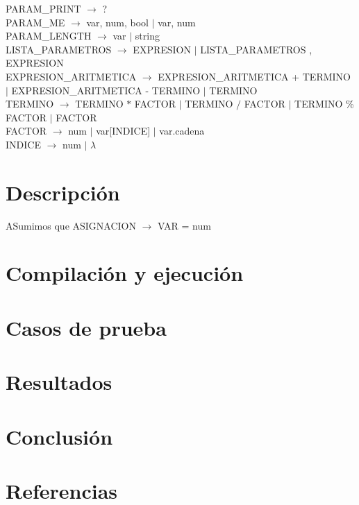 \documentclass[10pt,a4paper]{article}
\begin{document}
PARAM\_PRINT $\rightarrow$ ? \\

PARAM\_ME $\rightarrow$ var, num, bool $|$ var, num \\

PARAM\_LENGTH $\rightarrow$ var $|$ string \\

LISTA\_PARAMETROS $\rightarrow$ EXPRESION $|$ LISTA\_PARAMETROS , EXPRESION \\

EXPRESION\_ARITMETICA $\rightarrow$ EXPRESION\_ARITMETICA + TERMINO $|$ EXPRESION\_ARITMETICA - TERMINO $|$ TERMINO \\

TERMINO $\rightarrow$ TERMINO $*$ FACTOR $|$ TERMINO $/$ FACTOR $|$ TERMINO \% FACTOR $|$ FACTOR \\

FACTOR $\rightarrow$ num $|$ var[INDICE] $|$ var.cadena  \\

INDICE $\rightarrow$ num $|$  $\lambda$ \\


\section{Descripción}

ASumimos que ASIGNACION $\rightarrow$ VAR = num 


\section{Compilación y ejecución}

\section{Casos de prueba}

\section{Resultados}

\section{Conclusión}

\section{Referencias}
\end{document}
